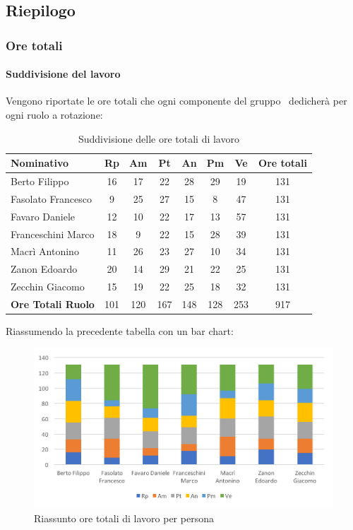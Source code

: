 \documentclass[../PianoDiProgetto.tex]{subfiles}
\begin{document}
	\newpage
	\subsection{Riepilogo}
		\subsubsection{Ore totali}
			\paragraph{Suddivisione del lavoro}
			Vengono riportate le ore totali che ogni componente del gruppo \kpanic\ dedicherà per ogni ruolo a rotazione:
			\begin{table}[h]
				\begin{tabularx}{\textwidth}{l * {6}{C} c}
				\toprule
				\textbf{Nominativo} & \textbf{Rp} & \textbf{Am} & \textbf{Pt} & \textbf{An} & \textbf{Pm} & \textbf{Ve} & \textbf{Ore totali} \\
				\midrule
				Berto Filippo &	16 & 17 & 22 & 28 & 29 & 19 & 131 \\
				Fasolato Francesco & 9 & 25 & 27 & 15 & 8 & 47 & 131 \\
				Favaro Daniele & 12 & 10 & 22 & 17 & 13 & 57 & 131 \\
				Franceschini Marco & 18 & 9 & 22 & 15 & 28 & 39 & 131 \\
				Macrì Antonino & 11 & 26 & 23 & 27 & 10 & 34 & 131 \\
				Zanon Edoardo &	20 & 14 & 29 & 21 & 22 & 25 & 131 \\
				Zecchin Giacomo & 15 & 19 & 22 & 25 & 18 & 32 & 131 \\
				\midrule			
				\textbf{Ore Totali Ruolo} & 101 & 120 & 167 & 148 & 128 & 253 & 917 \\
				\bottomrule
				\end{tabularx}
				\caption{Suddivisione delle ore totali di lavoro}		
			\end{table}

			Riassumendo la precedente tabella con un bar chart:
			\begin{figure}[!h]
				\centering
				\includegraphics[width=\textwidth]{Preventivo/Immagini/totale_oreRuoloPersona.png}
				\caption{Riassunto ore totali di lavoro per persona}
			\end{figure}	
			
\end{document}
